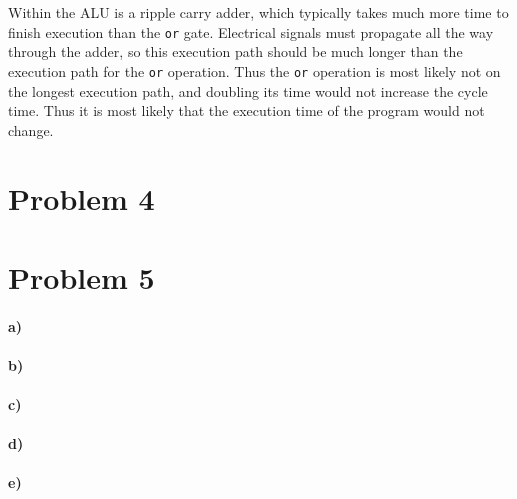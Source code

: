 \documentclass[12pt]{article}
\begin{document}
Within the ALU is a ripple carry adder, which typically takes much more time to finish execution than the \texttt{or} gate. Electrical signals must propagate all
the way through the adder, so this execution path should be much longer than the execution path for the \texttt{or} operation. Thus the \texttt{or} operation
is most likely not on the longest execution path, and doubling its time would not increase the cycle time. Thus it is most likely that the execution time of the
program would not change.

\section*{Problem 4}

\section*{Problem 5}

\paragraph{a)}

\paragraph{b)}

\paragraph{c)}

\paragraph{d)}

\paragraph{e)}
\end{document}
